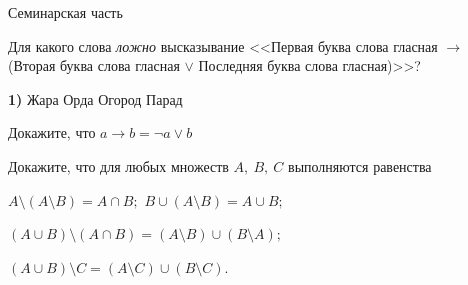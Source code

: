\begin{frame}{Семинарская часть}


\z Для какого слова {\it ложно} высказывание
<<Первая буква слова гласная $\rightarrow$ (Вторая буква слова гласная $\vee$ Последняя буква слова гласная)>>?

{\bf 1)} Жара  Орда  Огород  Парад

\z  Докажите, что $a \rightarrow b=\neg a \vee b$

\z Докажите, что для любых множеств $A,\ B,\ C$ выполняются равенства


\p $A \setminus (A \setminus  B)=A \cap B;$\quad
\p $B \cup(A \setminus  B)=A \cup B ;$

\p $(A \cup B) \setminus (A \cap B)=(A \setminus  B) \cup(B \setminus  A);$

\p $(A \cup B) \setminus  C=(A \setminus  C) \cup(B \setminus  C)$.

\end{frame}





